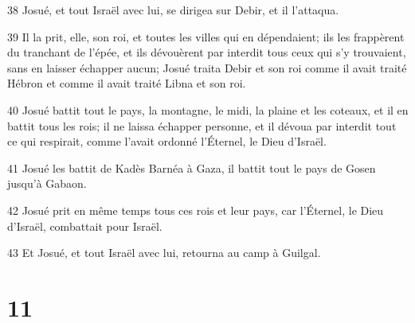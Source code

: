 \par 38 Josué, et tout Israël avec lui, se dirigea sur Debir, et il l'attaqua.
\par 39 Il la prit, elle, son roi, et toutes les villes qui en dépendaient; ils les frappèrent du tranchant de l'épée, et ils dévouèrent par interdit tous ceux qui s'y trouvaient, sans en laisser échapper aucun; Josué traita Debir et son roi comme il avait traité Hébron et comme il avait traité Libna et son roi.
\par 40 Josué battit tout le pays, la montagne, le midi, la plaine et les coteaux, et il en battit tous les rois; il ne laissa échapper personne, et il dévoua par interdit tout ce qui respirait, comme l'avait ordonné l'Éternel, le Dieu d'Israël.
\par 41 Josué les battit de Kadès Barnéa à Gaza, il battit tout le pays de Gosen jusqu'à Gabaon.
\par 42 Josué prit en même temps tous ces rois et leur pays, car l'Éternel, le Dieu d'Israël, combattait pour Israël.
\par 43 Et Josué, et tout Israël avec lui, retourna au camp à Guilgal.

\chapter{11}

